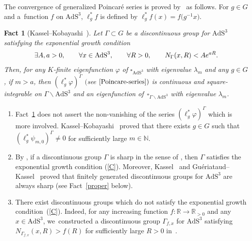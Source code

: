 \documentclass[11pt]{article}
\numberwithin{equation}{section}
\numberwithin{equation}{section}
\newtheorem{Fact}[Theorem]{Fact}
 { \theoremstyle{definition}
\newtheorem{Definition}[Theorem]{Definition}
\newtheorem{Note}[Theorem]{Note}
\newtheorem{Example}[Theorem]{Example}
\newtheorem{Remark}[Theorem]{Remark}
\newtheorem{Setting}[Theorem]{Setting}
\newtheorem{Notation}[Theorem]{Notation}
}
\begin{document}
The convergence of generalized Poincar\'e series is proved by~\cite{KaKob16} as follows.
For $g \in G$ and a~function $f$ on $\mathrm{AdS}^{3}$,
$\ell_{g}^{*}f$ is defined by $\ell_{g}^{*}f(x)=f\big(g^{-1}x\big)$.
\begin{Fact}[Kassel--Kobayashi~\cite{KaKob16}]\label{Poincare}
Let $\Gamma \subset G$ be a discontinuous group for $\mathrm{AdS}^{3}$
satisfying the exponential growth condition
\begin{gather}\label{C}
\exists A,a > 0,\qquad
\forall x\in \mathrm{AdS}^{3},\qquad
\forall R>0, \qquad
N_{\Gamma}(x,R) < A{\rm e}^{aR}.
\end{gather}
Then, for any $K$-finite eigenfunction $\varphi$ of $\square_{\mathrm{AdS}^{3}}$ with eigenvalue
$\lambda_{m}$
and any $g\in G$,
if $m > a$, then
$(\ell_{g}^{*}\varphi)^{\Gamma}$ $($see $\eqref{Poincare-series})$ is continuous and square-integrable on
$\Gamma\backslash\mathrm{AdS}^{3}$ and
an eigenfunction of~$\square_{\Gamma\backslash\mathrm{AdS}^{3}}$ with eigenvalue
$\lambda_{m}$.
\end{Fact}

\begin{Remark}\label{remPoincare}\quad
\begin{enumerate}\itemsep=0pt
\item[(1)]
Fact~\ref{Poincare} does not assert the non-vanishing of the series
$(\ell_{g}^{*}\varphi)^{\Gamma}$ which is more involved.
Kassel--Kobayashi~\cite{KaKob16} proved that
there exists $g\in G$ such that
$(\ell^{*}_{g}\psi_{m,0})^{\Gamma}\neq 0$
for sufficiently large $m \in \mathbb{N}$.
\item[(2)]
By \cite[Lemma~4.6.4]{KaKob16}, if a discontinuous group $\Gamma$ is sharp
in the sense of \cite[Definition~4.2]{KaKob16},
then $\Gamma$ satisfies the exponential growth condition (\ref{C}).
Moreover, Kassel~\cite{Ka09} and Gu\'eriataud--Kassel~\cite{GuKa17}
proved that finitely generated discontinuous groups for $\mathrm{AdS}^{3}$
are always sharp (see Fact~\ref{proper} below).
\item[(3)]
There exist discontinuous groups
which do not satisfy the exponential growth condition~(\ref{C}).
Indeed, for any increasing function $f\colon\mathbb{R}\rightarrow \mathbb{R}_{>0}$
and any $x\in\mathrm{AdS}^{3}$,
we~con\-st\-ructed
a discontinuous group $\Gamma_{f,x}$ for $\mathrm{AdS}^{3}$
satisfying $N_{\Gamma_{f,x}}(x,R) > f(R)$ for sufficiently large $R>0$ in~\cite{Kan19}.
\end{enumerate}
\end{Remark}
\end{document}
